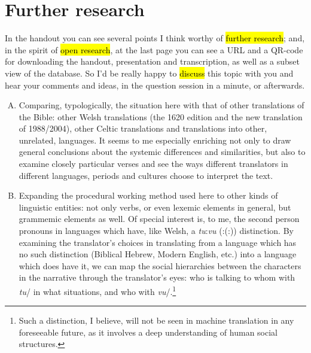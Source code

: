 \section{Further research}

\begin{paper}
	{\click} In the handout you can see several points I think worthy of \hl{further research}; and, in the spirit of \hl{open research}, at the last page you can see a URL and a QR-code for downloading the handout, presentation and transcription, as well as a subset view of the database. So I’d be really happy to \hl{discuss} this topic with you and hear your comments and ideas, in the question session in a minute, or afterwards.
\end{paper}

\begin{enumerate}[A.]
	\item Comparing, typologically, the situation here with that of other translations of the Bible: other Welsh translations (the 1620 edition and the new translation of 1988/2004), other Celtic translations and translations into other, unrelated, languages. It seems to me especially enriching not only to draw general conclusions about the systemic differences and similarities, but also to examine closely particular verses and see the ways different translators in different languages, periods and cultures choose to interpret the text.


	\item Expanding the procedural working method used here to other kinds of linguistic entities: not only verbs, or even lexemic elements in general, but grammemic elements as well. Of special interest is, to me, the second person pronouns in languages which have, like Welsh, a \mbox{\textit{tu}:\textit{vu}} (\mbox{:(:)}) distinction. By examining the translator’s choices in translating from a language which has no such distinction (Biblical Hebrew, Modern English, etc.) into a language which does have it, we can map the social hierarchies between the characters in the narrative through the translator’s eyes: who is talking to whom with \textit{tu}/ in what situations, and who with \textit{vu}/.\footnote{Such a distinction, I believe, will not be seen in machine translation in any foreseeable future, as it involves a deep understanding of {human} social structures.}



\end{enumerate}
